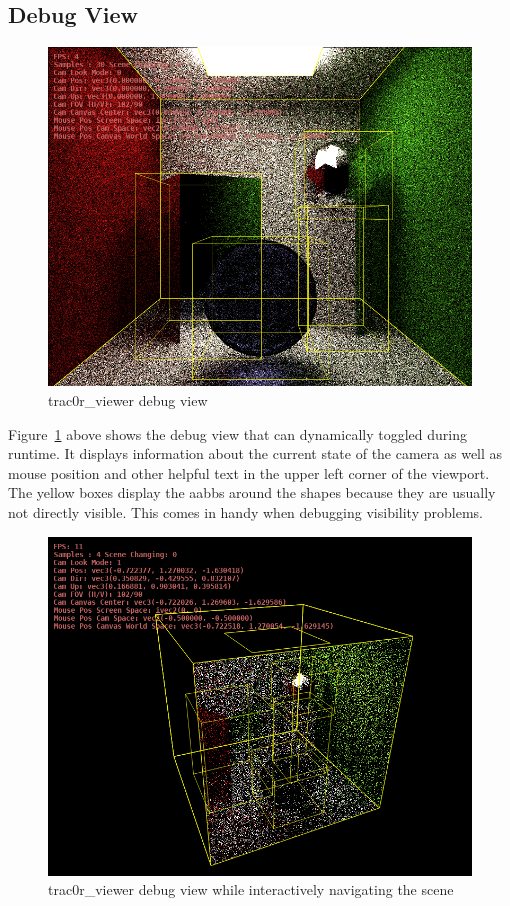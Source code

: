\documentclass[
  twoside,
  11pt, a4paper,
  footinclude=true,
  headinclude=true,
  cleardoublepage=empty
]{scrreprt}
\begin{document}
\subsection{Debug View}
\begin{figure}[H]
    \includegraphics[scale=0.5]{trac0r-debug1.png}
    \centering
    \caption{trac0r\_viewer debug view}
    \label{fig:trac0r_debug1}
\end{figure}

Figure~\ref{fig:trac0r_debug1} above shows the debug view that can dynamically toggled during
runtime. It displays information about the current state of the camera as well as mouse position
and other helpful text in the upper left corner of the
viewport. The yellow boxes display the \acp{aabb} around the shapes because they are usually not
directly visible. This comes in handy when debugging visibility problems.

\begin{figure}[H]
    \includegraphics[scale=0.5]{trac0r-debug2.png}
    \centering
    \caption{trac0r\_viewer debug view while interactively navigating the scene}
    \label{fig:trac0r_debug2}
\end{figure}
\end{document}

